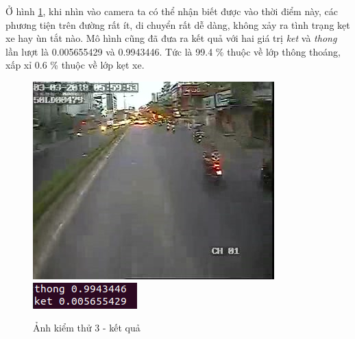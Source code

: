 	\pagebreak
	Ở hình \ref{fig:test3}, khi nhìn vào camera ta có thể nhận biết được vào thời điểm này, các phương tiện trên đường rất ít, di chuyển rất dễ dàng, không xảy ra tình trạng kẹt xe hay ùn tắt nào. Mô hình cũng đã đưa ra kết quả với hai giá trị \textit{ket} và \textit{thong} lần lượt là 0.005655429 và 0.9943446. Tức là 99.4 \% thuộc về lớp thông thoáng, xấp xỉ 0.6 \% thuộc về lớp kẹt xe. \par
	\begin{figure}[h!]
		\centering
		\includegraphics[scale=1]{charts/image0125.jpg}
		\includegraphics[scale=0.5]{charts/most-last-res.png}
		\caption{Ảnh kiểm thử 3 - kết quả}
		\label{fig:test3}
	\end{figure}
	
